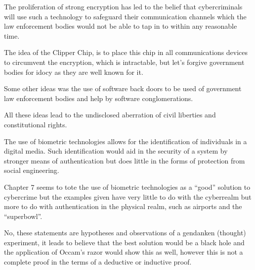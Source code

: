

The proliferation of strong encryption has led to the belief that cybercriminals will use such a technology to safeguard their communication channels which the law enforcement bodies would not be able to tap in to within any reasonable time.

The idea of the Clipper Chip, is to place this chip in all communications devices to circumvent the encryption, which is intractable, but let's forgive government bodies for idocy as they are well known for it.

Some other ideas was the use of software back doors to be used of government law enforcement bodies and help by software conglomerations.

All these ideas lead to the undisclosed aberration of civil liberties and constitutional rights.



The use of biometric technologies allows for the identification of individuals in a digital media. Such identification would aid in the security of a system by stronger means of authentication but does little in the forms of protection from social engineering.

Chapter 7 seems to tote the use of biometric technologies as a ``good'' solution to cybercrime but the examples given have very little to do with the cyberrealm but more to do with authentication in the physical realm, such as airports and the ``superbowl''.




No, these statements are hypotheses and observations of a gendanken (thought) experiment, it leads to believe that the best solution would be a black hole and the application of Occam's razor would show this as well, however this is not a complete proof in the terms of a deductive or inductive proof.


